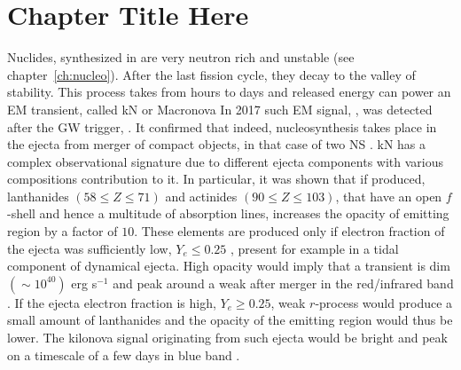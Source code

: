 
\chapter{Chapter Title Here} %

\label{ch:kilonova} %





Nuclides, synthesized in \rproc{} are very neutron rich and unstable (see chapter~\ref{ch:nucleo}). 
After the last fission cycle, they decay to the valley of stability. 
This process takes from hours to days and released energy can power an 
\ac{EM} transient, called \ac{kN} or Macronova  
\citep[\eg][]{Li:1998bw,Kulkarni:2005jw,Metzger:2010,Roberts:2011,Metzger:2016pju,Wollaeger:2017ahm}
%
In 2017 such \ac{EM} signal, \AT{}, was detected after the \ac{GW} trigger, \GW{}
\citep{TheLIGOScientific:2017qsa,Abbott:2018wiz,LIGOScientific:2018mvr}.
It confirmed that indeed, \rproc{} nucleosynthesis takes place in the ejecta from merger 
of compact objects, in that case of two \ac{NS} 
\citep{Arcavi:2017xiz,Coulter:2017wya,Drout:2017ijr,Evans:2017mmy,Hallinan:2017woc,Kasliwal:2017ngb,
    Nicholl:2017ahq,Smartt:2017fuw,Soares-santos:2017lru,Tanvir:2017pws,
    Troja:2017nqp,Mooley:2018dlz,Ruan:2017bha,Lyman:2018qjg}. 
\ac{kN} has a complex observational signature due to different ejecta components with various 
compositions contribution to it. In particular, it was shown that if produced, 
lanthanides $(58\leq Z \leq71)$ and actinides $(90\leq Z \leq 103)$, that have an open $f$-shell 
and hence a multitude of absorption lines, increases the opacity of emitting region by a factor of $10$. 
These elements are produced only if electron fraction of the ejecta was sufficiently low, 
$Y_e\leq 0.25$ \citep{Lippuner:2015gwa}, present for example in a tidal component of dynamical ejecta. 
High opacity would imply that a transient is dim $(\sim10^{40})$ erg s$^{-1}$ and peak around a 
weak after merger in the red/infrared band \citep{Barnes:2013wka,Grossman:2013lqa,Lippuner:2015gwa}. 
If the ejecta electron fraction is high, $Y_e \geq 0.25$, weak $r$-process would produce a small amount 
of lanthanides and the opacity of the emitting region would thus be lower. The kilonova signal originating 
from such ejecta would be bright and peak on a timescale of a few days in blue band \citep{Kasen:2014toa,Martin:2015hxa}. 
